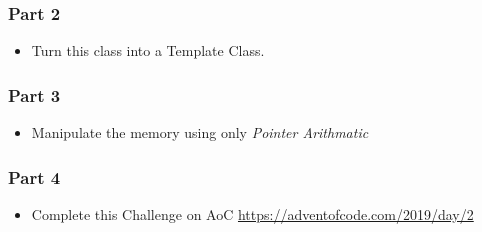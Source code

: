 \documentclass[11pt]{article}
\begin{document}
\subsubsection{Part 2}
\label{sec:orgaa4286d}
\begin{itemize}
\item Turn this class into a Template Class.
\end{itemize}
\subsubsection{Part 3}
\label{sec:orga002479}
\begin{itemize}
\item Manipulate the memory using only \emph{Pointer Arithmatic}
\end{itemize}
\subsubsection{Part 4}
\label{sec:org7fb4481}
\begin{itemize}
\item Complete this Challenge on AoC
\url{https://adventofcode.com/2019/day/2}
\end{itemize}
\end{document}
